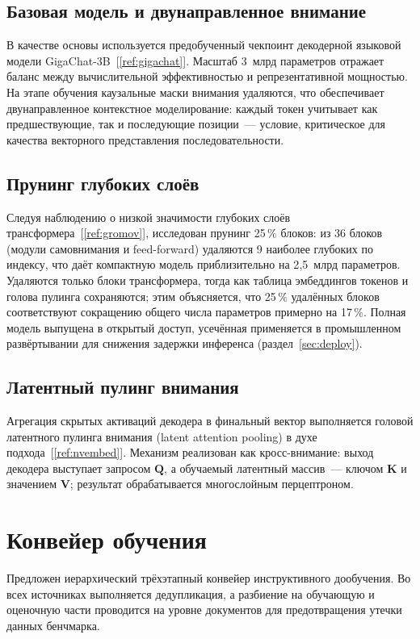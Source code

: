 \documentclass[12pt,a4paper]{article}
\begin{document}
\subsection{Базовая модель и двунаправленное внимание}
В качестве основы используется предобученный чекпоинт декодерной языковой модели
GigaChat-3B~[\ref{ref:gigachat}]. Масштаб 3~млрд параметров отражает баланс
между вычислительной эффективностью и репрезентативной мощностью. На этапе
обучения каузальные маски внимания удаляются, что обеспечивает двунаправленное
контекстное моделирование: каждый токен учитывает как предшествующие, так и
последующие позиции~--- условие, критическое для качества векторного
представления последовательности.

\subsection{Прунинг глубоких слоёв}
Следуя наблюдению о низкой значимости глубоких слоёв трансформера~[\ref{ref:gromov}],
исследован прунинг 25\,\% блоков: из 36 блоков (модули самовнимания и
feed-forward) удаляются 9 наиболее глубоких по индексу, что даёт компактную
модель приблизительно на 2{,}5~млрд параметров. Удаляются только блоки
трансформера, тогда как таблица эмбеддингов токенов и голова пулинга
сохраняются; этим объясняется, что 25\,\% удалённых блоков соответствуют
сокращению общего числа параметров примерно на 17\,\%. Полная модель выпущена в
открытый доступ, усечённая применяется в промышленном развёртывании для снижения
задержки инференса (раздел~\ref{sec:deploy}).

\subsection{Латентный пулинг внимания}
Агрегация скрытых активаций декодера в финальный вектор выполняется головой
латентного пулинга внимания (latent attention pooling) в духе
подхода~[\ref{ref:nvembed}]. Механизм реализован как кросс-внимание: выход
декодера выступает запросом $\mathbf{Q}$, а обучаемый латентный массив~---
ключом $\mathbf{K}$ и значением $\mathbf{V}$; результат обрабатывается
многослойным перцептроном.

\section{Конвейер обучения}\label{sec:training}
Предложен иерархический трёхэтапный конвейер инструктивного дообучения.
Во всех источниках выполняется дедупликация, а разбиение на обучающую и
оценочную части проводится на уровне документов для предотвращения утечки
данных бенчмарка.
\end{document}
